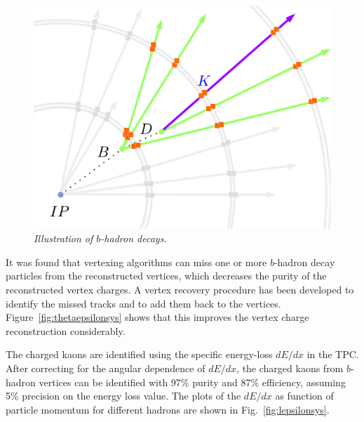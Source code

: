 \documentclass{PoS}
\begin{document}
\begin{figure}
	{\centering
		\includegraphics[width=0.4\linewidth]{../poster/figures/vtx.pdf}
		\caption{\sl Illustration of $b$-hadron decays. }
		\label{fig:vtx}
	}
\end{figure}
It was found that vertexing algorithms can miss one or more $b$-hadron decay particles from the reconstructed vertices, which decreases the purity of the reconstructed vertex charges.
A vertex recovery procedure has been developed to identify the missed tracks and to add them back to the vertices. Figure~\ref{fig:thetaepsilonsys} shows that this improves the vertex charge reconstruction considerably.


The charged kaons are identified using the specific energy-loss
$dE/dx$ in the TPC.
After correcting for the angular dependence of $dE/dx$, the charged kaons from $b$-hadron vertices can be identified with 97\% purity and 87\% efficiency, assuming 5\% precision on the energy loss value.
The plots of the $dE/dx$ as function of particle momentum for different hadrons are shown in Fig.~\ref{fig:lepsilonsys}.
\end{document}
